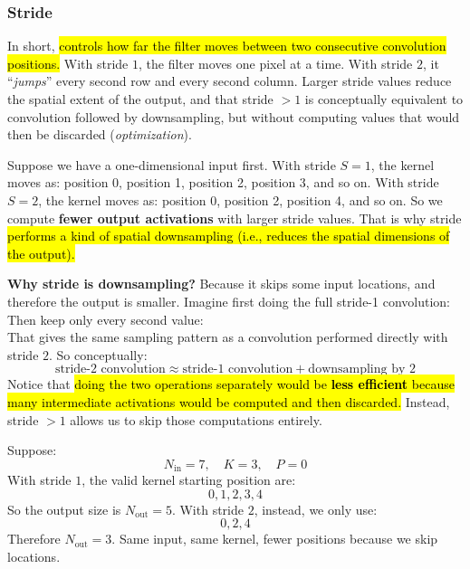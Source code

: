 \subsubsection{Stride}\label{sec:stride}

In short,  \hl{controls how far the filter moves between two consecutive convolution positions.} With stride $1$, the filter moves one pixel at a time. With stride $2$, it ``\emph{jumps}'' every second row and every second column. Larger stride values reduce the spatial extent of the output, and that stride $>1$ is conceptually equivalent to convolution followed by downsampling, but without computing values that would then be discarded (\emph{optimization}).

\highspace
Suppose we have a one-dimensional input first. With stride $S=1$, the kernel moves as: position 0, position 1, position 2, position 3, and so on. With stride $S=2$, the kernel moves as: position 0, position 2, position 4, and so on. So we compute \textbf{fewer output activations} with larger stride values. That is why stride \hl{performs a kind of spatial downsampling (i.e., reduces the spatial dimensions of the output).}

\highspace
\textcolor{Green3}{ \textbf{Why stride is downsampling?}} Because it skips some input locations, and therefore the output is smaller. Imagine first doing the full stride-1 convolution:
\begin{equation*}
    [a_0, a_1, a_2, a_3, a_4]
\end{equation*}
Then keep only every second value:
\begin{equation*}
    [a_0, a_2, a_4]
\end{equation*}
That gives the same sampling pattern as a convolution performed directly with stride $2$. So conceptually:
\begin{equation*}
    \text{stride-2 convolution} \approx \text{stride-1 convolution} + \text{downsampling by 2}
\end{equation*}
Notice that \hl{doing the two operations separately would be \textbf{less efficient} because many intermediate activations would be computed and then discarded.} Instead, stride $>1$ allows us to skip those computations entirely.

\highspace
\begin{examplebox}
    Suppose:
    \begin{equation*}
        N_{\text{in}} = 7, \quad K = 3, \quad P = 0
    \end{equation*}
    With stride $1$, the valid kernel starting position are:
    \begin{equation*}
        0, 1, 2, 3, 4
    \end{equation*}
    So the output size is $N_{\text{out}} = 5$. With stride $2$, instead, we only use:
    \begin{equation*}
        0, 2, 4
    \end{equation*}
    Therefore $N_{\text{out}} = 3$. Same input, same kernel, fewer positions because we skip locations.
\end{examplebox}

